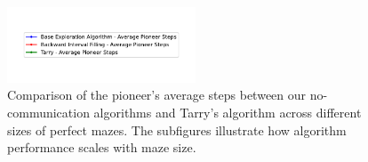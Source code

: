 \begin{figure}[H]
    \centering
    \qquad
    \qquad
    \includegraphics[width=0.5\textwidth]{Cap3/no_comm_steps_legend.pdf}
    \newline
    \qquad
    \newline
    \qquad
    \caption{Comparison of the pioneer's average steps between our no-communication algorithms and Tarry's algorithm across different sizes of perfect mazes. The subfigures illustrate how algorithm performance scales with maze size.}
    \label{fig_no_comm_steps_all_sizes_maze}
\end{figure}

